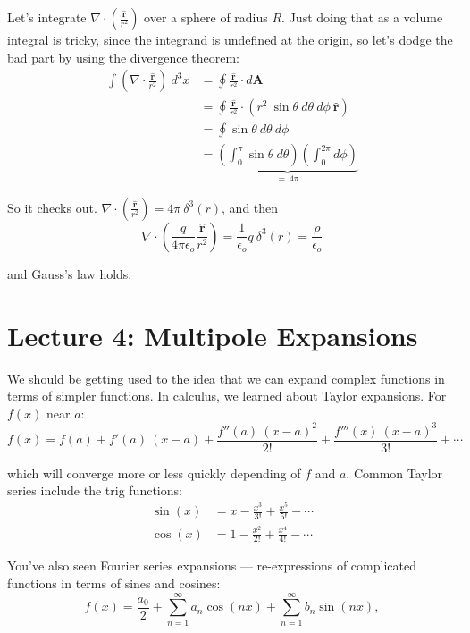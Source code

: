 \documentclass{article}
\numberwithin{equation}{section}
\newcommand{\rhat}{\mathbf{\hat{r}}}
\begin{document}
Let's integrate $\displaystyle \nabla \cdot \left( \frac{\rhat}{r^2} \right)$ over a sphere of radius $R$. Just doing that as a volume integral is tricky, since the integrand is undefined at the origin, so let's dodge the bad part by using the divergence theorem:
\begin{align*}
    \int \left( \nabla \cdot \frac{\rhat}{r^2} \right)\ d^3x &= \oint \frac{\rhat}{r^2} \cdot d\bm{A} \\
    &= \oint \frac{\rhat}{r^2} \cdot \left( r^2\ \sin{\theta}\ d\theta\ d\phi\ \rhat \right) \\
    &= \oint \sin{\theta}\ d\theta\ d\phi \\
    &= \underbrace{\left( \int_0^{\pi} \sin{\theta}\ d\theta \right) \left( \int_0^{2\pi} d\phi \right)}_{\displaystyle =\ 4\pi}
\end{align*}

So it checks out. $\displaystyle \nabla \cdot \left( \frac{\rhat}{r^2} \right) = 4\pi\ \delta^3(r)$, and then
\begin{equation*}
    \nabla \cdot \left( \frac{q}{4\pi\epsilon_o} \frac{\rhat}{r^2} \right) = \frac{1}{\epsilon_o} q\ \delta^3(r) = \frac{\rho}{\epsilon_o}
\end{equation*}

and Gauss's law holds.

\newpage

\section*{Lecture 4: Multipole Expansions}
\setcounter{page}{1}

We should be getting used to the idea that we can expand complex functions in terms of simpler functions. In calculus, we learned about Taylor expansions. For $f(x)$ near $a$:
\begin{equation*}
    f(x) = f(a) + f'(a)\ (x-a) + \frac{f''(a)\ (x-a)^2}{2!} + \frac{f'''(x)\ (x-a)^3}{3!} + \cdots
\end{equation*}

which will converge more or less quickly depending of $f$ and $a$. Common Taylor series include the trig functions:
\begin{align*}
    \sin{(x)} &= x - \frac{x^3}{3!} + \frac{x^5}{5!} - \cdots \\
    \cos{(x)} &= 1 - \frac{x^2}{2!} + \frac{x^4}{4!} - \cdots
\end{align*}

You've also seen Fourier series expansions --- re-expressions of complicated functions in terms of sines and cosines:
\begin{equation*}
    f(x) = \frac{a_0}{2} + \sum\limits_{n = 1}^{\infty} a_n \cos{(nx)} + \sum\limits_{n = 1}^{\infty} b_n \sin{(nx)},
\end{equation*}
\end{document}
